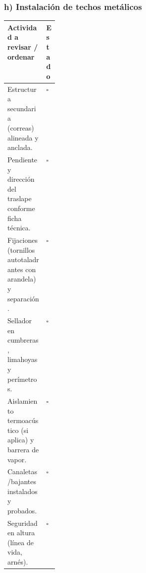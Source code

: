 \documentclass[12pt]{article}
\newcommand{\cbox}{\(\square\)} %
\begin{document}
	\subsubsection*{h) Instalación de techos metálicos}
	\small\renewcommand{\arraystretch}{1.2}
	\begin{tabularx}{\linewidth}{
			>{\raggedright\arraybackslash}X >{\centering\arraybackslash}p{0.12\linewidth}}
		\toprule
		\textbf{Actividad a revisar / ordenar} & \textbf{Estado} \\
		\midrule
		Estructura secundaria (correas) alineada y anclada. & \cbox \\
		Pendiente y dirección del traslape conforme ficha técnica. & \cbox \\
		Fijaciones (tornillos autotaladrantes con arandela) y separación. & \cbox \\
		Sellador en cumbreras, limahoyas y perímetros. & \cbox \\
		Aislamiento termoacústico (si aplica) y barrera de vapor. & \cbox \\
		Canaletas/bajantes instalados y probados. & \cbox \\
		Seguridad en altura (línea de vida, arnés). & \cbox \\
		\bottomrule
	\end{tabularx}
	
	
	
	
\end{document}
